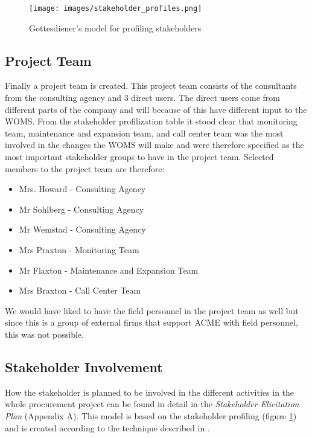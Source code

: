 \documentclass[a4paper]{article}
\begin{document}
\begin{figure}[H]
	\texttt{[image: images/stakeholder\_profiles.png]}
	\caption{Gottesdiener's model for profiling stakeholders \cite{gott3}}
	\label{figure:stakeholder_profiles}
\end{figure}

\subsection{Project Team}
\label{sub:project_team}
Finally a project team is created. This project team consists of the consultants from the consulting agency and 3 direct users. The direct users come from different parts of the company and will because of this have different input to the WOMS. From the stakeholder profilization table it stood clear that monitoring team, maintenance and expansion team, and call center team was the most involved in the changes the WOMS will make and were therefore specified as the most important stakeholder groups to have in the project team. Selected members to the project team are therefore:
\begin{itemize}
\item Mrs. Howard		- Consulting Agency
\item Mr Sohlberg	- Consulting Agency
\item Mr Wemstad	- Consulting Agency
\item Mrs Praxton		- Monitoring Team
\item Mr Flaxton		- Maintenance and Expansion Team
\item Mrs Braxton		- Call Center Team
\end{itemize}


We would have liked to have the field personnel in the project team as well but since this is a group of  external firms that support ACME with field personnel, this was not possible.

\subsection{Stakeholder Involvement}
\label{stakeholder_involvment}
How the stakeholder is planned to be involved in the different activities in the whole procurement project can be found in detail in the \emph{Stakeholder Elicitation Plan} (Appendix A). This model is based on the stakeholder profiling (figure \ref{figure:stakeholder_profiles}) and is created according to the technique described in \cite{gott3}.
\end{document}
